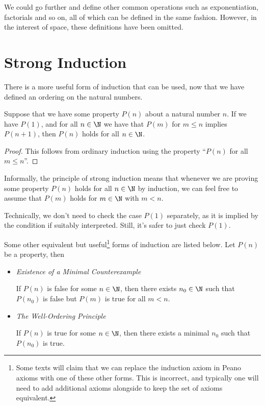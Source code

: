 \documentclass[a4paper]{scrreprt}
\begin{document}
We could go further and define other common operations such as exponentiation, factorials and so on, all of which can be defined in the same fashion. However, in the interest of space, these definitions have been omitted.

\section{Strong Induction}

There is a more useful form of induction that can be used, now that we have defined an ordering on the natural numbers.

\begin{proposition}
	Suppose that we have some property $P(n)$ about a natural number $n$. If we have $P(1)$, and for all $n \in \N$ we have that $P(m)$ for $m \leq n$ implies $P(n + 1)$, then $P(n)$ holds for all $n \in \N$.
\end{proposition}
\begin{proof}
	This follows from ordinary induction using the property ``$P(n)$ for all $m \leq n$''.
\end{proof}

Informally, the principle of strong induction means that whenever we are proving some property $P(n)$ holds for all $n \in \N$ by induction, we can feel free to assume that $P(m)$ holds for $m \in \N$ with $m < n$.

\begin{remark}
	Technically, we don't need to check the case $P(1)$ separately, as it is implied by the condition if suitably interpreted. Still, it's safer to just check $P(1)$.
\end{remark}


Some other equivalent but useful\footnote{Some texts will claim that we can replace the induction axiom in Peano axioms with one of these other forms. This is incorrect, and typically one will need to add additional axioms alongside to keep the set of axioms equivalent.} forms of induction are listed below. Let $P(n)$ be a property, then
\begin{itemize}
	\item \emph{Existence of a Minimal Counterexample}
	
	If $P(n)$ is false for some $n \in \N$, then there exists $n_0 \in \N$ such that $P(n_0)$ is false but $P(m)$ is true for all $m < n$.

	\item \emph{The Well-Ordering Principle}
	
	If $P(n)$ is true for some $n \in \N$, then there exists a minimal $n_0$ such that $P(n_0)$ is true.
\end{itemize}
\end{document}
